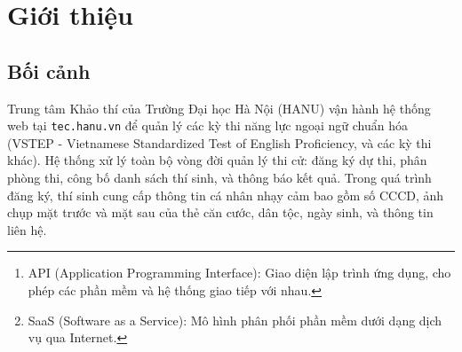 \documentclass[12pt,a4paper]{article}
\begin{document}
\begin{abstract}
Báo cáo này ghi lại quá trình nghiên cứu bảo mật đối với ứng dụng web của Trung tâm Khảo thí, Trường Đại học Hà Nội (HANU), tại địa chỉ \texttt{tec.hanu.vn}. Cuộc điều tra được khởi xướng sau khi phát hiện thông tin cá nhân đầy đủ (PII) của một thí sinh được Google lập chỉ mục công khai. Thông qua việc dịch ngược (reverse engineering) framework JavaScript tiếng Việt tùy chỉnh do I\&E Việt Nam (\texttt{inevn.com}) phát triển, tôi đã lập bản đồ cơ sở dữ liệu hoàn chỉnh, xác định các điểm cuối API\footnote{API (Application Programming Interface): Giao diện lập trình ứng dụng, cho phép các phần mềm và hệ thống giao tiếp với nhau.} không xác thực, và chứng minh khả năng trích xuất có hệ thống dữ liệu cá nhân của 896 thí sinh - bao gồm số CCCD/CMND, dân tộc, nơi sinh, và \textbf{ảnh chụp mặt trước và mặt sau của căn cước công dân}. Hạ tầng bị lộ trải dài trên nhiều tên miền do nền tảng ``Connections'' của I\&E Việt Nam vận hành, phơi bày rủi ro bên thứ ba mang tính hệ thống khi dữ liệu nhạy cảm của trường đại học được lưu trữ trên nền tảng SaaS\footnote{SaaS (Software as a Service): Mô hình phân phối phần mềm dưới dạng dịch vụ qua Internet.} dùng chung không có phân quyền truy cập. Báo cáo này trình bày chi tiết phương pháp tấn công, mối quan hệ giữa HANU và I\&E Việt Nam, phân tích hạ tầng CDN, và toàn bộ chuỗi kỹ thuật được sử dụng để truy cập dữ liệu công dân nhạy cảm.
\end{abstract}

\tableofcontents
\newpage

\section{Giới thiệu}
\label{sec:intro}

\subsection{Bối cảnh}

Trung tâm Khảo thí của Trường Đại học Hà Nội (HANU) vận hành hệ thống web tại \texttt{tec.hanu.vn} để quản lý các kỳ thi năng lực ngoại ngữ chuẩn hóa (VSTEP - Vietnamese Standardized Test of English Proficiency, và các kỳ thi khác). Hệ thống xử lý toàn bộ vòng đời quản lý thi cử: đăng ký dự thi, phân phòng thi, công bố danh sách thí sinh, và thông báo kết quả. Trong quá trình đăng ký, thí sinh cung cấp thông tin cá nhân nhạy cảm bao gồm số CCCD, ảnh chụp mặt trước và mặt sau của thẻ căn cước, dân tộc, ngày sinh, và thông tin liên hệ.
\end{document}
